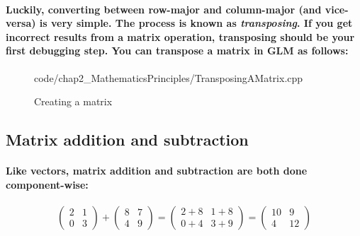 \paragraph{
    Luckily, converting between row-major and column-major (and vice-versa) is very simple. The process is known as \emph{transposing}. If you get incorrect results from a matrix operation, transposing should be your first debugging step. You can transpose a matrix in GLM as follows:
}

\begin{frame}{}
    \begin{figure}[ht]
    \centering
    \colorbox{backgroundcolor}{
        \parbox{0.9\textwidth}{
            
            {code/chap2_MathematicsPrinciples/TransposingAMatrix.cpp}
        }
    }
    \caption{Creating a matrix}
    \label{fig:creating_a_matrixtwo}
    \end{figure}
\end{frame}

\subsection{\textsf{Matrix addition and subtraction}}
\paragraph{
    Like vectors, matrix addition and subtraction are both done component-wise:
}

\paragraph{
    \begin{equation*}
    \begin{pmatrix}
    2 & 1\\
    0 & 3
    \end{pmatrix} +\begin{pmatrix}
    8 & 7\\
    4 & 9
    \end{pmatrix} =\begin{pmatrix}
    2+8 & 1+8\\
    0+4 & 3+9
    \end{pmatrix} =\begin{pmatrix}
    10 & 9\\
    4 & 12
    \end{pmatrix}
    \end{equation*}
}

